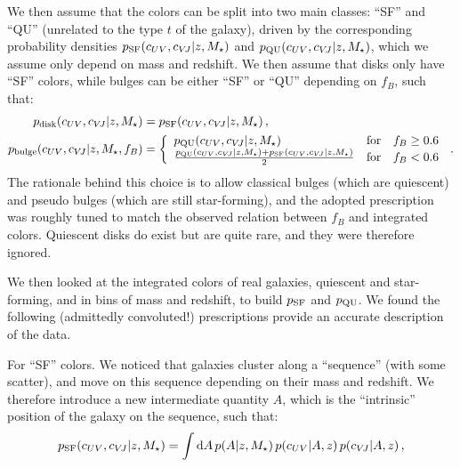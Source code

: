 \documentclass[11pt,a4paper]{article}
\newcommand{\mstar}{M_\star}
\newcommand{\dd}{\mathrm{d}}
\numberwithin{equation}{section}
\begin{document}
We then assume that the colors can be split into two main classes: ``SF'' and ``QU'' (unrelated to the type $t$ of the galaxy), driven by the corresponding probability densities $p_{\rm SF}(c_{UV}, c_{V\!J} | z, \mstar)$ and $p_{\rm QU}(c_{UV}, c_{V\!J} | z, \mstar)$, which we assume only depend on mass and redshift. We then assume that disks only have ``SF'' colors, while bulges can be either ``SF'' or ``QU'' depending on $f_B$, such that:
\begin{align}
p_{\rm disk}(c_{UV}, c_{V\!J} | z, \mstar) &= p_{\rm SF}(c_{UV}, c_{V\!J} | z, \mstar)\,, \\
p_{\rm bulge}(c_{UV}, c_{V\!J} | z, \mstar, f_B) &= \left\{\begin{array}{lll}
p_{\rm QU}(c_{UV}, c_{V\!J} | z, \mstar) & \text{for} & f_B \ge 0.6 \\
\frac{p_{\rm QU}(c_{UV}, c_{V\!J} | z, \mstar) + p_{\rm SF}(c_{UV}, c_{V\!J} | z, \mstar)}{2} & \text{for} & f_B < 0.6
\end{array}\right.\,.
\end{align}
The rationale behind this choice is to allow classical bulges (which are quiescent) and pseudo bulges (which are still star-forming), and the adopted prescription was roughly tuned to match the observed relation between $f_B$ and integrated colors. Quiescent disks do exist but are quite rare, and they were therefore ignored.

We then looked at the integrated colors of real galaxies, quiescent and star-forming, and in bins of mass and redshift, to build $p_{\rm SF}$ and $p_{\rm QU}$. We found the following (admittedly convoluted!) prescriptions provide an accurate description of the data.

For ``SF'' colors. We noticed that galaxies cluster along a ``sequence'' (with some scatter), and move on this sequence depending on their mass and redshift. We therefore introduce a new intermediate quantity $A$, which is the ``intrinsic'' position of the galaxy on the sequence, such that:
\begin{align}
p_{\rm SF}(c_{UV}, c_{V\!J} | z, \mstar) = \int \dd A\,p(A | z, \mstar)\,p(c_{UV} | A,z)\,p(c_{V\!J} | A,z)\,,
\end{align}
\end{document}
